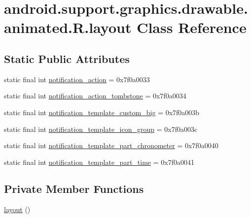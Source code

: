 \hypertarget{classandroid_1_1support_1_1graphics_1_1drawable_1_1animated_1_1_r_1_1layout}{}\section{android.\+support.\+graphics.\+drawable.\+animated.\+R.\+layout Class Reference}
\label{classandroid_1_1support_1_1graphics_1_1drawable_1_1animated_1_1_r_1_1layout}
\subsection*{Static Public Attributes}
\begin{DoxyCompactItemize}
\item 
static final int \mbox{\hyperlink{classandroid_1_1support_1_1graphics_1_1drawable_1_1animated_1_1_r_1_1layout_ab6a7ce2bec7c419bd056344980a2bfe4}{notification\+\_\+action}} = 0x7f0a0033
\item 
static final int \mbox{\hyperlink{classandroid_1_1support_1_1graphics_1_1drawable_1_1animated_1_1_r_1_1layout_ad267220bf2614e287a423c9daae9d5ba}{notification\+\_\+action\+\_\+tombstone}} = 0x7f0a0034
\item 
static final int \mbox{\hyperlink{classandroid_1_1support_1_1graphics_1_1drawable_1_1animated_1_1_r_1_1layout_a91cd88a6160b017d7b1e33d028625488}{notification\+\_\+template\+\_\+custom\+\_\+big}} = 0x7f0a003b
\item 
static final int \mbox{\hyperlink{classandroid_1_1support_1_1graphics_1_1drawable_1_1animated_1_1_r_1_1layout_af7a9952feddc7fe876e7cf9cf469b843}{notification\+\_\+template\+\_\+icon\+\_\+group}} = 0x7f0a003c
\item 
static final int \mbox{\hyperlink{classandroid_1_1support_1_1graphics_1_1drawable_1_1animated_1_1_r_1_1layout_a11d27386cb41f01081c07de501f821a2}{notification\+\_\+template\+\_\+part\+\_\+chronometer}} = 0x7f0a0040
\item 
static final int \mbox{\hyperlink{classandroid_1_1support_1_1graphics_1_1drawable_1_1animated_1_1_r_1_1layout_a58ea2615a1760f93ef687e8c1db58feb}{notification\+\_\+template\+\_\+part\+\_\+time}} = 0x7f0a0041
\end{DoxyCompactItemize}
\subsection*{Private Member Functions}
\begin{DoxyCompactItemize}
\item 
\mbox{\hyperlink{classandroid_1_1support_1_1graphics_1_1drawable_1_1animated_1_1_r_1_1layout_a6044f0738bc43d7db66ec3bd043af088}{layout}} ()
\end{DoxyCompactItemize}


